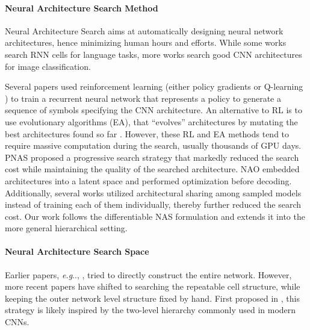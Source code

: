 \documentclass[10pt,twocolumn,letterpaper]{article}
\makeatletter
\def\@onedot{\ifx\@let@token.\else.\null\fi\xspace}
\DeclareRobustCommand\onedot{\futurelet\@let@token\@onedot}
\def\eg{\emph{e.g}\onedot} \def\Eg{\emph{E.g}\onedot}
\makeatother
\begin{document}
\vspace{-0.5\baselineskip}
\paragraph{Neural Architecture Search Method}

Neural Architecture Search aims at automatically designing neural network architectures, hence minimizing human hours and efforts.
While some works \cite{greff2015lstm, jozefowicz2015empirical, zoph2017neural, liu2018darts} search RNN cells for language tasks, more works search good CNN architectures for image classification.

Several papers used reinforcement learning (either policy gradients \cite{zoph2017neural, zoph2017learning, cai2018efficient, tan2018mnasnet} or Q-learning \cite{baker2017designing, zhong2018practical}) to train a recurrent neural network that represents a policy to generate a sequence of symbols specifying the CNN architecture.
An alternative to RL is to use evolutionary algorithms (EA), that ``evolves'' architectures by mutating the best architectures found so far \cite{real2017large, xie2017genetic, miikkulainen2017evolving, liu2018hierarchical, real2018regularized}.
However, these RL and EA methods tend to require massive computation during the search, usually thousands of GPU days. 
PNAS \cite{liu2018progressive} proposed a progressive search strategy that markedly reduced the search cost while maintaining the quality of the searched architecture.
NAO \cite{luo2018neural} embedded architectures into a latent space and performed optimization before decoding.
Additionally, several works \cite{pham2018efficient, liu2018darts, ahmed2018maskconnect} utilized architectural sharing among sampled models instead of training each of them individually, thereby further reduced the search cost.
Our work follows the differentiable NAS formulation \cite{shin2018differentiable, liu2018darts} and extends it into the more general hierarchical setting.

\vspace{-0.5\baselineskip}
\paragraph{Neural Architecture Search Space}

Earlier papers, \eg, \cite{zoph2017neural, real2017large}, tried to directly construct the entire network. 
However, more recent papers \cite{zoph2017learning, liu2018progressive, real2018regularized, pham2018efficient, liu2018darts} have shifted to searching the repeatable cell structure, while keeping the outer network level structure fixed by hand.
First proposed in \cite{zoph2017learning}, this strategy is likely inspired by the two-level hierarchy commonly used in modern CNNs.
\end{document}

